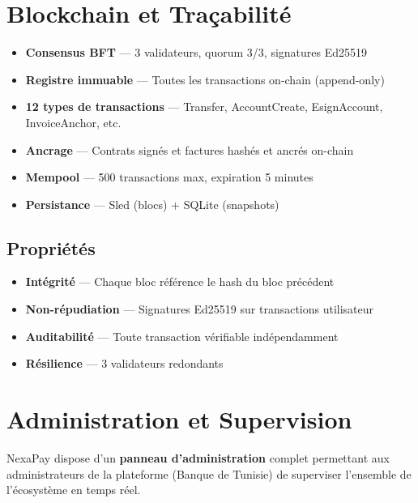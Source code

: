 \documentclass[11pt,a4paper]{article}
\begin{document}
\newpage

\section{Blockchain et Tra\c{c}abilit\'e}

\begin{itemize}[leftmargin=*]
    \item \textbf{Consensus BFT} --- 3 validateurs, quorum 3/3, signatures Ed25519
    \item \textbf{Registre immuable} --- Toutes les transactions on-chain (append-only)
    \item \textbf{12 types de transactions} --- Transfer, AccountCreate, EsignAccount, InvoiceAnchor, etc.
    \item \textbf{Ancrage} --- Contrats sign\'es et factures hash\'es et ancr\'es on-chain
    \item \textbf{Mempool} --- 500 transactions max, expiration 5 minutes
    \item \textbf{Persistance} --- Sled (blocs) + SQLite (snapshots)
\end{itemize}

\subsection{Propri\'et\'es}

\begin{itemize}[leftmargin=*]
    \item \textbf{Int\'egrit\'e} --- Chaque bloc r\'ef\'erence le hash du bloc pr\'ec\'edent
    \item \textbf{Non-r\'epudiation} --- Signatures Ed25519 sur transactions utilisateur
    \item \textbf{Auditabilit\'e} --- Toute transaction v\'erifiable ind\'ependamment
    \item \textbf{R\'esilience} --- 3 validateurs redondants
\end{itemize}

\newpage

\section{Administration et Supervision}

NexaPay dispose d'un \textbf{panneau d'administration} complet permettant aux administrateurs de la plateforme (Banque de Tunisie) de superviser l'ensemble de l'\'ecosyst\`eme en temps r\'eel.
\end{document}
